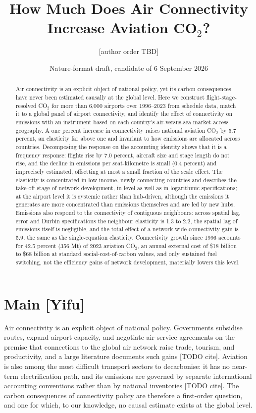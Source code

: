 \documentclass[12pt]{article}
\title{How Much Does Air Connectivity Increase Aviation CO$_2$?}
\author{[author order TBD]}
\date{Nature-format draft, candidate of 6 September 2026}
\begin{document}
\maketitle

\begin{abstract}
\noindent Air connectivity is an explicit object of national policy, yet its
carbon consequences have never been estimated causally at the global level.
Here we construct flight-stage-resolved CO$_2$ for more than 6{,}000
airports over 1996--2023 from schedule data, match it to a global panel of
airport connectivity, and identify the effect of connectivity on emissions
with an instrument based on each country's air-versus-sea market-access
geography. A one percent increase in connectivity raises national aviation
CO$_2$ by 5.7 percent, an elasticity far above one and invariant to how
emissions are allocated across countries. Decomposing the response on the
accounting identity shows that it is a frequency response: flights rise by
7.0 percent, aircraft size and stage length do not rise, and the decline in
emissions per seat-kilometre is small (0.4 percent) and imprecisely
estimated, offsetting at most a small fraction of the scale effect. The elasticity is concentrated in low-income, newly connecting
countries and describes the take-off stage of network development, in
level as well as in logarithmic specifications; at the airport level it is systemic rather than hub-driven,
although the emissions it generates are more concentrated than emissions
themselves and are led by new hubs. Emissions also respond to the
connectivity of contiguous neighbours: across spatial lag, error and Durbin
specifications the neighbour elasticity is 1.3 to 2.2, the spatial lag of
emissions itself is negligible, and the total effect of a network-wide
connectivity gain is 5.9, the same as the single-equation elasticity. Connectivity growth since
1996 accounts for 42.5 percent (356 Mt) of 2023 aviation CO$_2$, an annual
external cost of \$18 billion to \$68 billion at standard social-cost-of-carbon
values, and only sustained fuel switching, not the efficiency gains of
network development, materially lowers this level.
\end{abstract}

\section*{Main [Yifu]}
Air connectivity is an explicit object of national policy. Governments
subsidise routes, expand airport capacity, and negotiate air-service
agreements on the premise that connections to the global air network raise
trade, tourism, and productivity, and a large literature documents such
gains [TODO cite]. Aviation is also among the most difficult transport
sectors to decarbonise: it has no near-term electrification path, and its
emissions are governed by separate international accounting conventions
rather than by national inventories [TODO cite]. The carbon consequences of
connectivity policy are therefore a first-order question, and one for
which, to our knowledge, no causal estimate exists at the global level.
\end{document}
